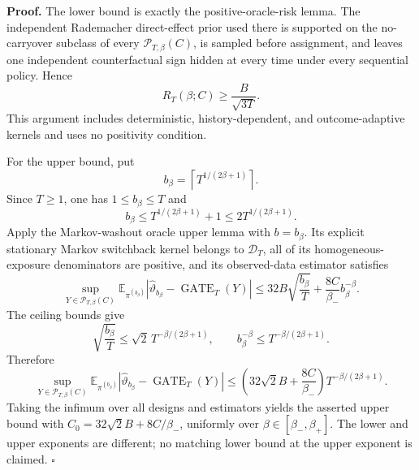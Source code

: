 \textbf{Proof.} The lower bound is exactly the positive-oracle-risk lemma. The independent Rademacher direct-effect prior used there is supported on the no-carryover subclass of every \(\mathcal P_{T,\beta}(C)\), is sampled before assignment, and leaves one independent counterfactual sign hidden at every time under every sequential policy. Hence
\[
R_T(\beta;C)\ge \frac{B}{\sqrt{3T}}.
\]
This argument includes deterministic, history-dependent, and outcome-adaptive kernels and uses no positivity condition.

For the upper bound, put
\[
b_\beta=\left\lceil T^{1/(2\beta+1)}\right\rceil.
\]
Since \(T\ge1\), one has \(1\le b_\beta\le T\) and
\[
b_\beta\le T^{1/(2\beta+1)}+1\le2T^{1/(2\beta+1)}.
\]
Apply the Markov-washout oracle upper lemma with \(b=b_\beta\). Its explicit stationary Markov switchback kernel belongs to \(\mathcal D_T\), all of its homogeneous-exposure denominators are positive, and its observed-data estimator satisfies
\[
\sup_{Y\in\mathcal P_{T,\beta}(C)}
\mathbb E_{\pi^{(b_\beta)}}
\left|\widehat\vartheta_{b_\beta}-\operatorname{GATE}_T(Y)\right|
\le 32B\sqrt{\frac{b_\beta}{T}}
+\frac{8C}{\beta_-}b_\beta^{-\beta}.
\]
The ceiling bounds give
\[
\sqrt{\frac{b_\beta}{T}}
\le\sqrt2\,T^{-\beta/(2\beta+1)},
\qquad
b_\beta^{-\beta}\le T^{-\beta/(2\beta+1)}.
\]
Therefore
\[
\sup_{Y\in\mathcal P_{T,\beta}(C)}
\mathbb E_{\pi^{(b_\beta)}}
\left|\widehat\vartheta_{b_\beta}-\operatorname{GATE}_T(Y)\right|
\le
\left(32\sqrt2 B+\frac{8C}{\beta_-}\right)
T^{-\beta/(2\beta+1)}.
\]
Taking the infimum over all designs and estimators yields the asserted upper bound with \(C_0=32\sqrt2 B+8C/\beta_-\), uniformly over \(\beta\in[\beta_-,\beta_+]\). The lower and upper exponents are different; no matching lower bound at the upper exponent is claimed. \(\square\)